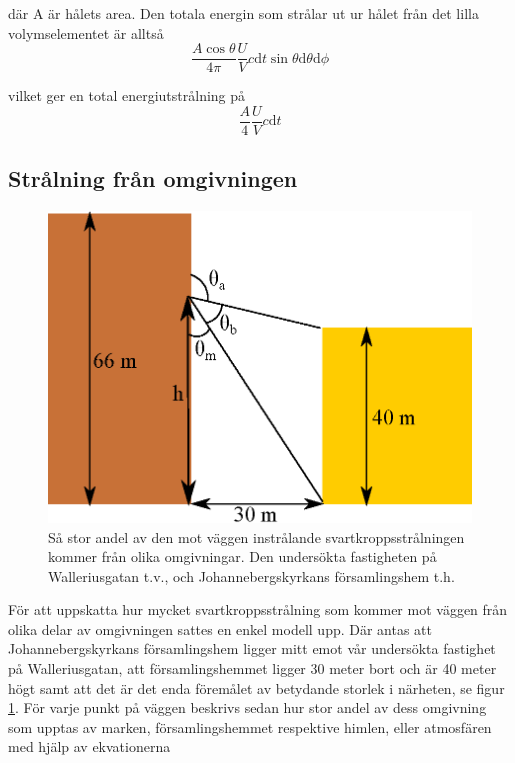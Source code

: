 där A är hålets area. Den totala energin som strålar ut ur hålet från det lilla 
volymselementet är alltså 
\begin{equation}
\frac{A\cos\theta}{4\pi}\frac{U}{V} c\mathrm{d}t \sin\theta\mathrm{d}\theta \mathrm{d}\phi
\end{equation}

vilket ger en total energiutstrålning på
\begin{equation}
\frac{A}{4}\frac{U}{V}c \mathrm{d}t
\end{equation}

\subsection{Strålning från omgivningen}

\begin{figure}[hpbt]
\centering
\includegraphics[height=0.3\textheight]{images/blackbody_surroundings.eps}
\caption{\label{fig:surroundings}{Så stor andel av den mot väggen instrålande 
svartkroppsstrålningen kommer från olika omgivningar. Den undersökta fastigheten på 
Walleriusgatan t.v., och Johannebergskyrkans församlingshem t.h.}}
\end{figure}

För att uppskatta hur mycket svartkroppsstrålning som kommer mot väggen från olika 
delar av omgivningen sattes en enkel modell upp. Där antas att Johannebergskyrkans 
församlingshem ligger mitt emot vår undersökta fastighet på Walleriusgatan, att 
församlingshemmet ligger 30 meter bort och är 40 meter högt samt att det är det enda 
föremålet av betydande storlek i närheten, se figur \ref{fig:surroundings}. För varje punkt
 på väggen beskrivs sedan hur stor andel av dess omgivning som upptas av marken, 
 församlingshemmet respektive himlen, eller atmosfären med hjälp av ekvationerna

